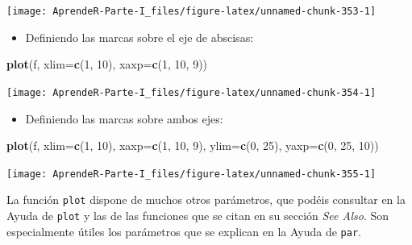 \documentclass[]{book}
\newenvironment{Shaded}{\begin{snugshade}}{\end{snugshade}}
\newcommand{\DataTypeTok}[1]{\textcolor[rgb]{0.13,0.29,0.53}{#1}}
\newcommand{\DecValTok}[1]{\textcolor[rgb]{0.00,0.00,0.81}{#1}}
\newcommand{\KeywordTok}[1]{\textcolor[rgb]{0.13,0.29,0.53}{\textbf{#1}}}
\newcommand{\NormalTok}[1]{#1}
\providecommand{\tightlist}{%
  \setlength{\itemsep}{0pt}\setlength{\parskip}{0pt}}
\theoremstyle{definition}
\theoremstyle{definition}
\theoremstyle{definition}
\theoremstyle{remark}
\begin{document}
\begin{center}\texttt{[image: AprendeR-Parte-I\_files/figure-latex/unnamed-chunk-353-1]} \end{center}

\begin{itemize}
\tightlist
\item
  Definiendo las marcas sobre el eje de abscisas:
\end{itemize}

\begin{Shaded}
\begin{Highlighting}[]
\KeywordTok{plot}\NormalTok{(f, }\DataTypeTok{xlim=}\KeywordTok{c}\NormalTok{(}\DecValTok{1}\NormalTok{, }\DecValTok{10}\NormalTok{), }\DataTypeTok{xaxp=}\KeywordTok{c}\NormalTok{(}\DecValTok{1}\NormalTok{, }\DecValTok{10}\NormalTok{, }\DecValTok{9}\NormalTok{))}
\end{Highlighting}
\end{Shaded}

\begin{center}\texttt{[image: AprendeR-Parte-I\_files/figure-latex/unnamed-chunk-354-1]} \end{center}

\begin{itemize}
\tightlist
\item
  Definiendo las marcas sobre ambos ejes:
\end{itemize}

\begin{Shaded}
\begin{Highlighting}[]
\KeywordTok{plot}\NormalTok{(f, }\DataTypeTok{xlim=}\KeywordTok{c}\NormalTok{(}\DecValTok{1}\NormalTok{, }\DecValTok{10}\NormalTok{), }\DataTypeTok{xaxp=}\KeywordTok{c}\NormalTok{(}\DecValTok{1}\NormalTok{, }\DecValTok{10}\NormalTok{, }\DecValTok{9}\NormalTok{), }\DataTypeTok{ylim=}\KeywordTok{c}\NormalTok{(}\DecValTok{0}\NormalTok{, }\DecValTok{25}\NormalTok{), }\DataTypeTok{yaxp=}\KeywordTok{c}\NormalTok{(}\DecValTok{0}\NormalTok{, }\DecValTok{25}\NormalTok{, }\DecValTok{10}\NormalTok{))}
\end{Highlighting}
\end{Shaded}

\begin{center}\texttt{[image: AprendeR-Parte-I\_files/figure-latex/unnamed-chunk-355-1]} \end{center}

La función \texttt{plot} dispone de muchos otros parámetros, que podéis consultar en la Ayuda de \texttt{plot} y las de las funciones que se citan en su sección \emph{See Also}. Son especialmente útiles los parámetros que se explican en la Ayuda de \texttt{par}.
\end{document}
